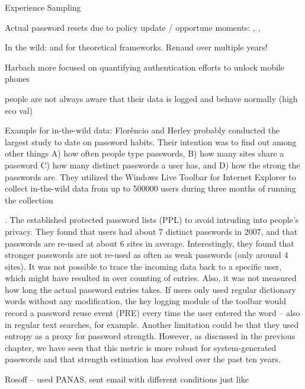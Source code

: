 Experience Sampling \cite{Consolvo2003ESM} 

Actual password resets due to policy update / opportune moments: \cite{Fahl2013EcologicalValidityPasswordStudy}, \cite{Mazurek2013Measuring}, \cite{Renaud2017LessonsLearnedNudges}

In the wild: \cite{Chamberlain2012ResearchInTheWild} and \cite{Henze2013EmpiricalResearchUbiquitous} for theoretical frameworks.
Renaud \cite{Renaud2017LessonsLearnedNudges} over multiple years!

Harbach more focused on quantifying authentication efforts to unlock mobile phones \cite{Harbach2016HardLockLife} 

people are not always aware that their data is logged and behave normally (high eco val)

Example for in-the-wild data: 
Flor\^{e}ncio and Herley probably conducted the largest study to date on password habits. Their intention was to find out among other things A) how often people type passwords, B) how many sites share a password C) how many distinct passwords a user has, and D) how the strong the passwords are. They utilized the Windows Live Toolbar for Internet Explorer to collect in-the-wild data from up to 500000 users during three months of running the collection

\cite{Florencio2007LargeScaleStudyPasswordHabits}. The established protected password lists (PPL) to avoid intruding into people's privacy. They found that users had about 7 distinct passwords in 2007, and that passwords are re-used at about 6 sites in average. Interestingly, they found that stronger passwords are not re-used as often as weak passwords (only around 4 sites). It was not possible to trace the incoming data back to a specific user, which might have resulted in over counting of entries. Also, it was not measured how long the actual password entries takes. If users only used regular dictionary words without any modification, the key logging module of the toolbar would record a password reuse event (PRE) every time the user entered the word -- also in regular text searches, for example. Another limitation could be that they used entropy as a proxy for password strength. However, as discussed in the previous chapter, we have seen that this metric is more robust for system-generated passwords and that strength estimation has evolved over the past ten years. 

Rosoff \etal \cite{Rosoff2014BehavioralExperimentsFraud} -- used PANAS, sent email with different conditions just like \cite{Huh2017TooBusy}


